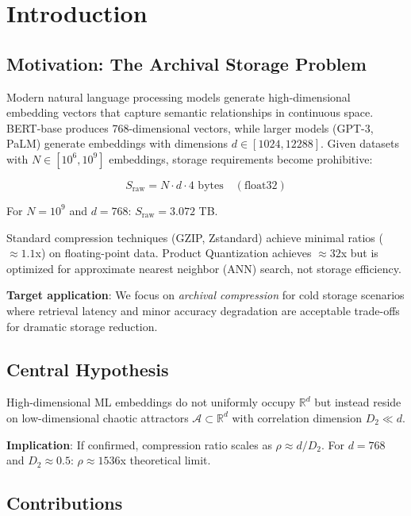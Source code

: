 \documentclass[utf8]{FrontiersinVancouver}
\begin{document}
\section{Introduction}

\subsection{Motivation: The Archival Storage Problem}

Modern natural language processing models generate high-dimensional embedding vectors that capture semantic relationships in continuous space. BERT-base produces 768-dimensional vectors, while larger models (GPT-3, PaLM) generate embeddings with dimensions $d \in [1024, 12288]$. Given datasets with $N \in [10^6, 10^9]$ embeddings, storage requirements become prohibitive:

\begin{equation}
S_{\text{raw}} = N \cdot d \cdot 4 \text{ bytes} \quad (\text{float32})
\end{equation}

For $N = 10^9$ and $d = 768$: $S_{\text{raw}} = 3.072$ TB.

Standard compression techniques (GZIP, Zstandard) achieve minimal ratios ($\approx 1.1$x) on floating-point data. Product Quantization achieves $\approx 32$x but is optimized for approximate nearest neighbor (ANN) search, not storage efficiency.

\textbf{Target application}: We focus on \textit{archival compression} for cold storage scenarios where retrieval latency and minor accuracy degradation are acceptable trade-offs for dramatic storage reduction.

\subsection{Central Hypothesis}

High-dimensional ML embeddings do not uniformly occupy $\mathbb{R}^d$ but instead reside on low-dimensional chaotic attractors $\mathcal{A} \subset \mathbb{R}^d$ with correlation dimension $D_2 \ll d$.

\textbf{Implication}: If confirmed, compression ratio scales as $\rho \approx d/D_2$. For $d = 768$ and $D_2 \approx 0.5$: $\rho \approx 1536$x theoretical limit.

\subsection{Contributions}
\end{document}
